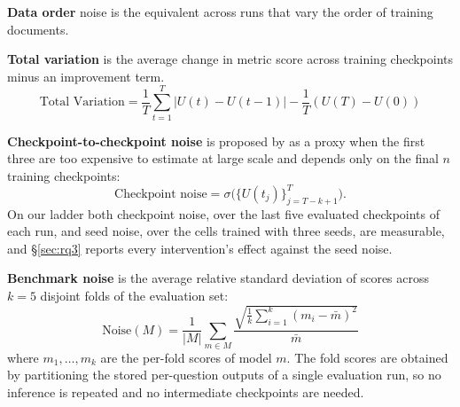 \textbf{Data order} noise is the equivalent across runs that vary the order of training documents. 

\textbf{Total variation} is the average change in metric score across training checkpoints minus an improvement term.
\label{app:total-variation}
\begin{equation}
\text{Total Variation} = \textstyle\frac{1}{T} \sum_{t=1}^{T} |U(t) - U(t-1)| - \frac{1}{T}(U(T) - U(0))
\end{equation}

\textbf{Checkpoint-to-checkpoint noise} is proposed by \citet{heineman_signal_2025} as a proxy when the first three are too expensive to estimate at large scale and depends only on the final $n$ training checkpoints:
\begin{equation}
\text{Checkpoint noise} = \sigma\big(\{U(t_j)\}_{j=T-k+1}^{T}\big).
\end{equation}
On our ladder both checkpoint noise, over the last five evaluated checkpoints of each run, and seed noise, over the cells trained with three seeds, are measurable, and \S\ref{sec:rq3} reports every intervention's effect against the seed noise.

\textbf{Benchmark noise} is the average relative standard deviation of scores across $k = 5$ disjoint folds of the evaluation set:
\begin{equation}
\text{Noise}(M) = \frac{1}{|M|} \sum_{m \in M} \frac{\sqrt{\tfrac{1}{k}\sum_{i=1}^{k}(m_i - \bar{m})^2}}{\bar{m}}
\end{equation}
where $m_1, \dots, m_k$ are the per-fold scores of model $m$. 
The fold scores are obtained by partitioning the stored per-question outputs of a single evaluation run, so no inference is repeated and no intermediate checkpoints are needed.

